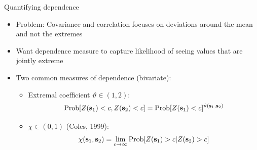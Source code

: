 \documentclass{beamer}
\begin{document}


\begin{frame}{Quantifying dependence}
	\begin{itemize}\setlength{\itemsep}{1em}
		\item \alert{Problem}: Covariance and correlation focuses on deviations around the mean and not the extremes
		\item Want dependence measure to capture likelihood of seeing values that are jointly extreme
		\item Two common measures of dependence (bivariate):
		\begin{itemize}\setlength{\itemsep}{0.5em}
			\item Extremal coefficient $\vartheta \in (1, 2)$: $$\mbox{Prob}[Z(\mathbf{s}_1)<c, Z(\mathbf{s}_2)<c] = \mbox{Prob}[Z(\mathbf{s}_1)<c]^{\vartheta(\mathbf{s}_1,\mathbf{s}_2)}$$
			\item $\chi \in (0, 1)$ (Coles, 1999): $$\chi(\mathbf{s}_1,\mathbf{s}_2) = \lim_{c\rightarrow \infty}\mbox{Prob}[Z(\mathbf{s}_1)>c|Z(\mathbf{s}_2)>c]$$
		\end{itemize}
	\end{itemize}
\end{frame}
\end{document}
